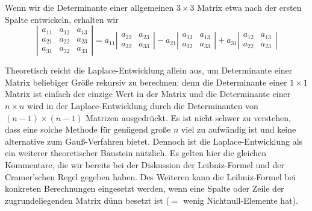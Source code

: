 \begin{bsp}[$ n=3 $]
	Wenn wir die Determinante einer allgemeinen $3 \times 3$ Matrix etwa nach der ersten Spalte entwickeln, erhalten wir
	\begin{equation*}
		\left| \begin{matrix}
			a_{11} & a_{12} & a_{13} \\
			a_{21} & a_{22} & a_{23} \\
			a_{31} & a_{32} & a_{33}
		\end{matrix} \right|
		= a_{11} \left| \begin{matrix}
			a_{22} & a_{23} \\
			a_{32} & a_{33}
		\end{matrix} \right|
		- a_{21} \left| \begin{matrix}
			a_{12} & a_{13} \\
			a_{32} & a_{33}
		\end{matrix} \right|
		+ a_{31} \left| \begin{matrix}
			a_{12} & a_{13} \\
			a_{22} & a_{23}
		\end{matrix} \right|
	\end{equation*}
\end{bsp}

Theoretisch reicht die Laplace-Entwicklung allein aus, um Determinante einer Matrix beliebiger Größe rekursiv zu berechnen: denn die Determinante einer $1 \times 1$ Matrix ist einfach der einzige Wert in der Matrix und die Determinante einer $n \times n$ wird in der Laplace-Entwicklung durch die Determinanten von $(n-1) \times (n-1)$ Matrizen ausgedrückt. Es ist nicht schwer zu verstehen, dass eine solche Methode für genügend große $n$ viel zu aufwändig ist und keine alternative zum Gauß-Verfahren bietet. Dennoch ist die Laplace-Entwicklung als ein weiterer theoretischer Baustein nützlich. Es gelten hier die gleichen Kommentare, die wir bereits bei der Diskussion der Leibniz-Formel und der Cramer'schen Regel gegeben haben. Des Weiteren kann die Leibniz-Formel bei konkreten Berechnungen eingesetzt werden, wenn eine Spalte oder Zeile der zugrundeliegenden Matrix dünn besetzt ist ($=$ wenig Nichtnull-Elemente hat). 


